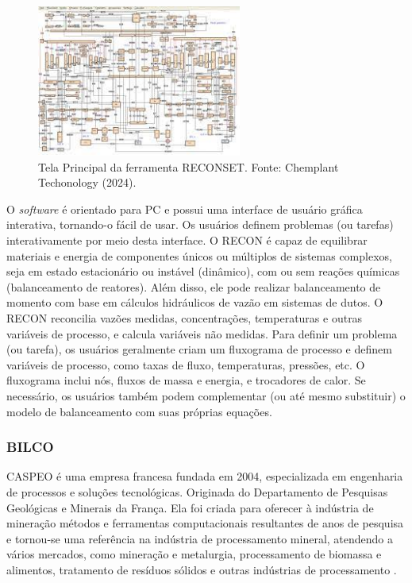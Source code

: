 \begin{figure}[htbp!] 
    \centering
    \includegraphics[width=0.6\textwidth]{figuras/RECONSET.jpg}
    \caption{Tela Principal da ferramenta RECONSET. Fonte: Chemplant Techonology (2024).}
    \label{fig:RECONSET}
\end{figure}

O \textit{software} é orientado para PC e possui uma interface de usuário gráfica interativa, tornando-o fácil de usar. Os usuários definem problemas (ou tarefas) interativamente por meio desta interface. O RECON é capaz de equilibrar materiais e energia de componentes únicos ou múltiplos de sistemas complexos, seja em estado estacionário ou instável (dinâmico), com ou sem reações químicas (balanceamento de reatores). Além disso, ele pode realizar balanceamento de momento com base em cálculos hidráulicos de vazão em sistemas de dutos. O RECON reconcilia vazões medidas, concentrações, temperaturas e outras variáveis de processo, e calcula variáveis não medidas. Para definir um problema (ou tarefa), os usuários geralmente criam um fluxograma de processo e definem variáveis de processo, como taxas de fluxo, temperaturas, pressões, etc. O fluxograma inclui nós, fluxos de massa e energia, e trocadores de calor. Se necessário, os usuários também podem complementar (ou até mesmo substituir) o modelo de balanceamento com suas próprias equações.

\subsubsection{BILCO}

CASPEO é uma empresa francesa fundada em 2004, especializada em engenharia de processos e soluções tecnológicas. Originada do 
Departamento de Pesquisas Geológicas e Minerais da França. Ela foi criada para oferecer à indústria de mineração métodos e ferramentas computacionais resultantes de anos de pesquisa e tornou-se uma referência na indústria de processamento mineral, atendendo a vários mercados, como mineração e metalurgia, processamento de biomassa e alimentos, tratamento de resíduos sólidos e outras indústrias de processamento \cite{bilco}.

